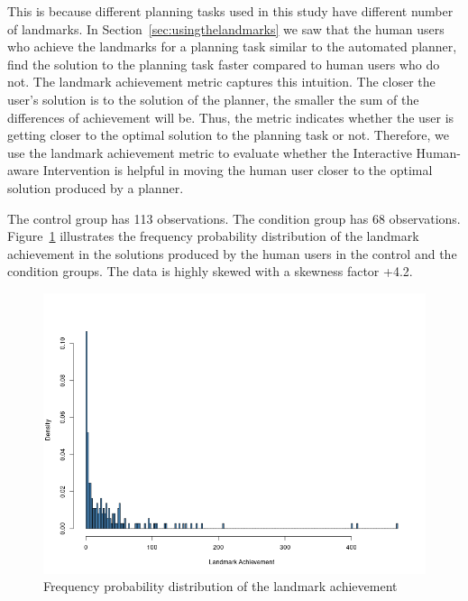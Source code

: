 This is because different planning tasks used in this study have different number of landmarks.
In Section~\ref{sec:usingthelandmarks} we saw that the human users who achieve the landmarks for a planning task similar to the automated planner, find the solution to the planning task faster compared to human users who do not.
The landmark achievement metric captures this intuition.
The closer the user's solution is to the solution of the planner, the smaller the sum of the differences of achievement will be.
Thus, the metric indicates whether the user is getting closer to the optimal solution to the planning task or not.
Therefore, we use the landmark achievement metric to evaluate whether the Interactive Human-aware Intervention is helpful in moving the human user closer to the optimal solution produced by a planner.

\begin{table}[tpb]
\centering
{}
\caption{Latest Landmark Achievement Times}
\label{tab:latest}
\end{table}

The control group has 113 observations.
The condition group has 68 observations.
Figure~\ref{fig:histach} illustrates the frequency probability distribution of the landmark achievement in the solutions produced by the human users in the control and the condition groups. 
The data is highly skewed with a skewness factor +4.2.
\begin{figure}[tpb]
  \centering
\includegraphics[width=0.7\columnwidth]{img/histo_ach.png}
  \caption{Frequency probability distribution of the landmark achievement}
  \label{fig:histach}
\end{figure}


